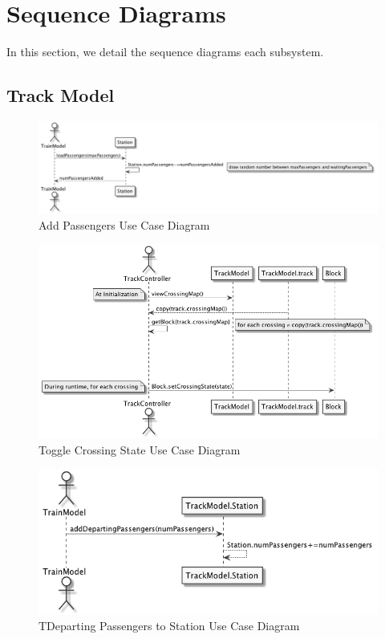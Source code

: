 \documentclass[]{article}
\begin{document}
\section{Sequence Diagrams}
In this section, we detail the sequence diagrams each subsystem.
\subsection{Track Model}
\begin{figure}[H]
	\centering
	\includegraphics[scale=.3]{addPassengers.png}
	\caption{Add Passengers Use Case Diagram}
\end{figure}

\begin{figure}[H]
	\centering
	\includegraphics[scale=.3]{crossing.png}
	\caption{Toggle Crossing State Use Case Diagram}
\end{figure}

\begin{figure}[H]
	\centering
	\includegraphics[scale=.3]{departPassengers.png}
	\caption{TDeparting Passengers to Station Use Case Diagram}
\end{figure}
\end{document}
